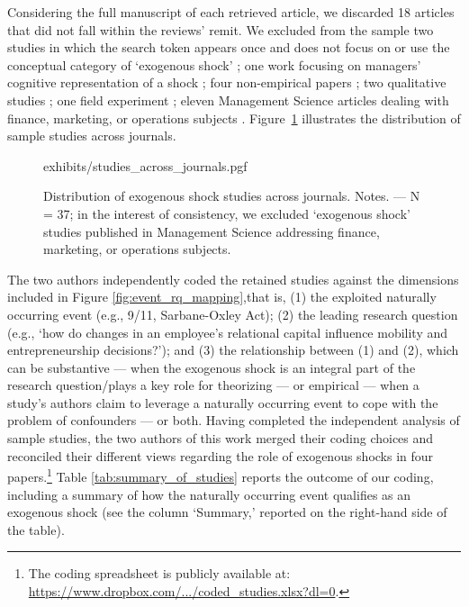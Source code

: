 \documentclass[11pt]{article}
\begin{document}
\begin{refsection}
Considering the full manuscript of each retrieved article, we discarded 18 articles that did not fall within the reviews' remit. We excluded from the sample two studies in which the search token appears once and does not focus on or use the conceptual category of `exogenous shock' \autocite{uzzi199735,kriauciunas2006659}; one work focusing on managers' cognitive representation of a shock \autocite{barreto2013687}; four non-empirical papers \autocite[e.g.,][]{mcsweeney2009933}; two qualitative studies \autocite{glynn20051031, jenkins2010884}; one field experiment  \autocite{cui20191216}; eleven Management Science articles dealing with finance, marketing, or operations subjects \autocite[e.g.,][]{tham20182901}. Figure~\ref{fig:studies_across_journals} illustrates the distribution of sample studies across journals.

\begin{figure}[!htbp]
    \centering
    {exhibits/studies_across_journals.pgf}
    \caption{Distribution of exogenous shock studies across
    journals.  Notes. --- N = 37; in the interest of consistency, we
    excluded `exogenous shock' studies published in Management Science
    addressing finance, marketing, or operations subjects.}
    \label{fig:studies_across_journals}
\end{figure}         

The two authors independently coded the retained studies against the dimensions included in Figure \ref{fig:event_rq_mapping},that is, (1) the exploited naturally occurring event (e.g., 9/11, Sarbane-Oxley Act); (2) the leading research question (e.g., `how do changes in an employee's relational capital influence mobility and entrepreneurship decisions?'); and (3) the relationship between (1) and (2), which can be substantive --- when the exogenous shock is an integral part of the research question/plays a key role for theorizing  --- or empirical --- when a study's authors claim to leverage a naturally occurring event to cope with the problem of confounders --- or both. Having completed the independent analysis of sample studies, the two authors of this work merged their coding choices and reconciled their different views regarding the role of exogenous shocks in four papers.\footnote{The coding spreadsheet is publicly available at: \href{ https://www.dropbox.com/s/yl0sf9p9tq253fy/coded_studies.csv?dl=0} {https://www.dropbox.com/.../coded\_studies.xlsx?dl=0}.} Table \ref{tab:summary_of_studies} reports the outcome of our coding, including a summary of how the naturally occurring event qualifies as an exogenous shock (see the column `Summary,' reported on the right-hand side of the table).


\end{refsection}
\end{document}
